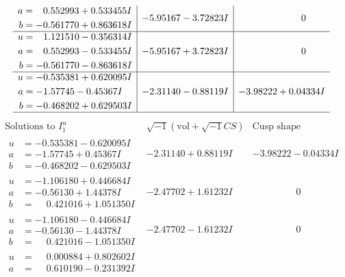 \documentclass[1p]{elsarticle_modified}
\theoremstyle{definition}
\newcommand{\I}{\sqrt{-1}}
\begin{document}
$$\begin{array}{c|c|c}
\begin{aligned}
a &= \phantom{-}0.552993 + 0.533455 I \\
b &= -0.561770 + 0.863618 I\end{aligned}
 & -5.95167 - 3.72823 I & \phantom{-0.000000 } 0 \\ \hline\begin{aligned}
u &= \phantom{-}1.121510 - 0.356314 I \\
a &= \phantom{-}0.552993 - 0.533455 I \\
b &= -0.561770 - 0.863618 I\end{aligned}
 & -5.95167 + 3.72823 I & \phantom{-0.000000 } 0 \\ \hline\begin{aligned}
u &= -0.535381 + 0.620095 I \\
a &= -1.57745 - 0.45367 I \\
b &= -0.468202 + 0.629503 I\end{aligned}
 & -2.31140 - 0.88119 I & -3.98222 + 0.04334 I\\
 \hline 
 \end{array}$$\newpage$$\begin{array}{c|c|c}  
\text{Solutions to }I^u_{1}& \I (\text{vol} + \sqrt{-1}CS) & \text{Cusp shape}\\
 \hline 
\begin{aligned}
u &= -0.535381 - 0.620095 I \\
a &= -1.57745 + 0.45367 I \\
b &= -0.468202 - 0.629503 I\end{aligned}
 & -2.31140 + 0.88119 I & -3.98222 - 0.04334 I \\ \hline\begin{aligned}
u &= -1.106180 + 0.446684 I \\
a &= -0.56130 + 1.44378 I \\
b &= \phantom{-}0.421016 + 1.051350 I\end{aligned}
 & -2.47702 + 1.61232 I & \phantom{-0.000000 } 0 \\ \hline\begin{aligned}
u &= -1.106180 - 0.446684 I \\
a &= -0.56130 - 1.44378 I \\
b &= \phantom{-}0.421016 - 1.051350 I\end{aligned}
 & -2.47702 - 1.61232 I & \phantom{-0.000000 } 0 \\ \hline\begin{aligned}
u &= \phantom{-}0.000884 + 0.802602 I \\
a &= \phantom{-}0.610190 - 0.231392 I \\

\end{aligned}
\end{array}$$
\end{document}
